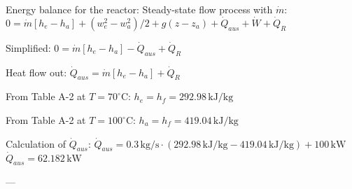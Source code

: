 Energy balance for the reactor: Steady-state flow process with \( \dot{m} \):  
\( 0 = \dot{m} [h_e - h_a] + (w_e^2 - w_a^2) / 2 + g(z - z_a) + \dot{Q}_{aus} + \dot{W} + \dot{Q}_R \)  

Simplified:  
\( 0 = \dot{m} [h_e - h_a] - \dot{Q}_{aus} + \dot{Q}_R \)  

Heat flow out:  
\( \dot{Q}_{aus} = \dot{m} [h_e - h_a] + \dot{Q}_R \)  

From Table A-2 at \( T = 70^\circ \text{C} \):  
\( h_e = h_f = 292.98 \, \text{kJ/kg} \)  

From Table A-2 at \( T = 100^\circ \text{C} \):  
\( h_a = h_f = 419.04 \, \text{kJ/kg} \)  

Calculation of \( \dot{Q}_{aus} \):  
\( \dot{Q}_{aus} = 0.3 \, \text{kg/s} \cdot (292.98 \, \text{kJ/kg} - 419.04 \, \text{kJ/kg}) + 100 \, \text{kW} \)  
\( \dot{Q}_{aus} = 62.182 \, \text{kW} \)  

---